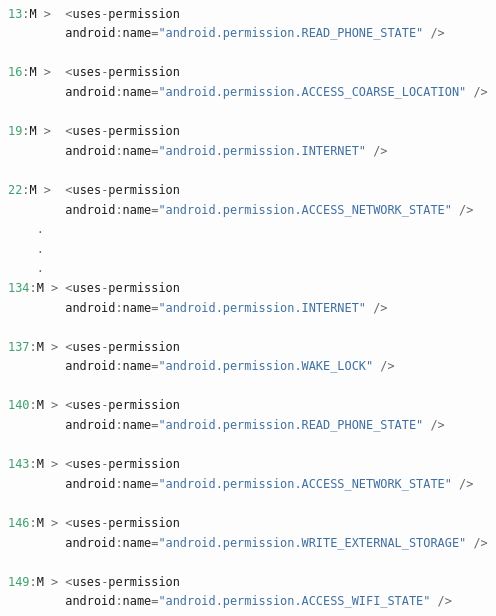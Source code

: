\begin{lstlisting}[caption={Example of duplicated permission from malicious version of app com.ifeel.frogjump}, language=Java,
    basicstyle=\fontsize{6}{5}\selectfont\ttfamily,
    label={lst:androidManifestDupli}]

13:M >  <uses-permission
        android:name="android.permission.READ_PHONE_STATE" />

16:M >  <uses-permission
        android:name="android.permission.ACCESS_COARSE_LOCATION" />

19:M >  <uses-permission
        android:name="android.permission.INTERNET" />

22:M >  <uses-permission
        android:name="android.permission.ACCESS_NETWORK_STATE" />
    .
    .
    .
134:M > <uses-permission
        android:name="android.permission.INTERNET" />

137:M > <uses-permission
        android:name="android.permission.WAKE_LOCK" />

140:M > <uses-permission
        android:name="android.permission.READ_PHONE_STATE" />

143:M > <uses-permission
        android:name="android.permission.ACCESS_NETWORK_STATE" />

146:M > <uses-permission
        android:name="android.permission.WRITE_EXTERNAL_STORAGE" />

149:M > <uses-permission
        android:name="android.permission.ACCESS_WIFI_STATE" />
\end{lstlisting}